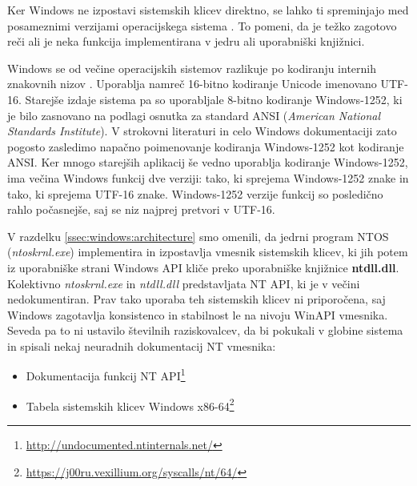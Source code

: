 \documentclass[a4paper,12pt,openright]{book}
\begin{document}
Ker Windows ne izpostavi sistemskih klicev direktno, se lahko ti spreminjajo med posameznimi verzijami operacijskega sistema \cite{Tanenbaum_Bos_2023}.
To pomeni, da je težko zagotovo reči ali je neka funkcija implementirana v jedru ali uporabniški knjižnici.

Windows se od večine operacijskih sistemov razlikuje po kodiranju internih znakovnih nizov \cite{Yosifovich_Russinovich_Solomon_Ionescu_2017}.
Uporablja namreč 16-bitno kodiranje Unicode imenovano UTF-16.
Starejše izdaje sistema pa so uporabljale 8-bitno kodiranje Windows-1252, ki je bilo zasnovano na podlagi osnutka za standard ANSI (\textit{American National Standards Institute}).
V strokovni literaturi in celo Windows dokumentaciji zato pogosto zasledimo napačno poimenovanje kodiranja Windows-1252 kot kodiranje ANSI.
Ker mnogo starejših aplikacij še vedno uporablja kodiranje Windows-1252, ima večina Windows funkcij dve verziji: tako, ki sprejema Windows-1252 znake in tako, ki sprejema UTF-16 znake.
Windows-1252 verzije funkcij so posledično rahlo počasnejše, saj se niz najprej pretvori v UTF-16.

V razdelku \ref{ssec:windows:architecture} smo omenili, da jedrni program NTOS (\textit{ntoskrnl.exe}) implementira in izpostavlja vmesnik sistemskih klicev, ki jih potem iz uporabniške strani Windows API kliče preko uporabniške knjižnice \textbf{ntdll.dll}.
Kolektivno \textit{ntoskrnl.exe} in \textit{ntdll.dll} predstavljata NT API, ki je v večini nedokumentiran.
Prav tako uporaba teh sistemskih klicev ni priporočena, saj Windows zagotavlja konsistenco in stabilnost le na nivoju WinAPI vmesnika.
Seveda pa to ni ustavilo številnih raziskovalcev, da bi pokukali v globine sistema in spisali nekaj neuradnih dokumentacij NT vmesnika:
\begin{itemize}
	\item Dokumentacija funkcij NT API\footnote{\url{http://undocumented.ntinternals.net/}}
	\item Tabela sistemskih klicev Windows x86-64\footnote{\url{https://j00ru.vexillium.org/syscalls/nt/64/}}
\end{itemize}
\end{document}
